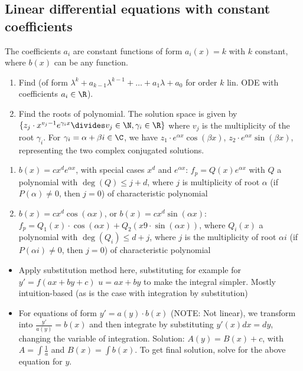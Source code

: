 \newsectionNoPB
\subsection{Linear differential equations with constant coefficients}
The coefficients $a_i$ are constant functions of form $a_i(x) = k$ with $k$ constant, where $b(x)$ can be any function.\\
%
\rmvspace
\begin{enumerate}[noitemsep]
    \item Find  (of form $\lambda^k + a_{k - 1} \lambda^{k - 1} + \ldots + a_1 \lambda + a_0$ for order $k$ lin. ODE with coefficients $a_i \in \R$).
    \item Find the roots of polynomial. The solution space is given by $\{ z_j \cdot x^{v_j - 1} e^{\gamma_i x} \divides v_j \in \N, \gamma_i \in \R \}$ where $v_j$ is the multiplicity of the root $\gamma_i$.
          For $\gamma_i = \alpha + \beta i \in \C$, we have $z_1 \cdot e^{\alpha x}\cos(\beta x)$, $z_2 \cdot e^{\alpha x}\sin(\beta x)$, representing the two complex conjugated solutions.
\end{enumerate}

\rmvspace
{}\rmvspace
\begin{enumerate}[noitemsep]
    \item {} $b(x) = c x^d e^{\alpha x}$, with special cases $x^d$ and $e^{\alpha x}$:
          $f_p = Q(x) e^{\alpha x}$ with $Q$ a polynomial with $\deg(Q) \leq j + d$, where $j$ is multiplicity of root $\alpha$ (if $P(\alpha) \neq 0$, then $j = 0$) of characteristic polynomial
    \item {} $b(x) = c x^d \cos(\alpha x)$, or $b(x) = c x^d \sin(\alpha x)$:
          $f_p = Q_1(x) \cdot \cos(\alpha x) + Q_2(x9 \cdot \sin(\alpha x))$,
          where $Q_i(x)$ a polynomial with $\deg(Q_i) \leq d + j$, where $j$ is the multiplicity of root $\alpha i$ (if $P(\alpha i) \neq 0$, then $j = 0$) of characteristic polynomial
\end{enumerate}

\rmvspace{}\rmvspace
\begin{itemize}[noitemsep]
    \item {} Apply substitution method here, substituting for example for $y' = f(ax + by + c)$ $u = ax + by$ to make the integral simpler.
          Mostly intuition-based (as is the case with integration by substitution)
    \item {} For equations of form $y' = a(y) \cdot b(x)$ (NOTE: Not linear),
          we transform into $\frac{y'}{a(y)} = b(x)$ and then integrate by substituting $y'(x) dx = dy$, changing the variable of integration.
          Solution: $A(y) = B(x) + c$, with $A = \int \frac{1}{a}$ and $B(x) = \int b(x)$.
          To get final solution, solve for the above equation for $y$.
\end{itemize}
